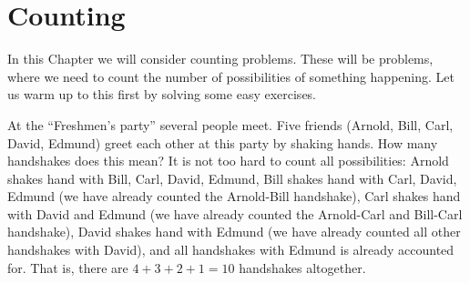 
\chapter{Counting}\label{cha:counting}


In this Chapter we will consider counting problems. 
These will be problems, 
where we need to count the number of possibilities of something happening. 
Let us warm up to this first by solving some easy exercises. 

At the ``Freshmen's party'' several people meet. 
Five friends (Arnold, Bill, Carl, David, Edmund) greet each other at this party by shaking hands. 
How many handshakes does this mean? 
It is not too hard to count all possibilities: 
Arnold shakes hand with Bill, Carl, David, Edmund, 
Bill shakes hand with Carl, David, Edmund (we have already counted the Arnold-Bill handshake), 
Carl shakes hand with David and Edmund (we have already counted the Arnold-Carl and Bill-Carl handshake), 
David shakes hand with Edmund (we have already counted all other handshakes with David), 
and all handshakes with Edmund is already accounted for. 
That is, there are $4 + 3 + 2 + 1 = 10$ handshakes altogether. 

